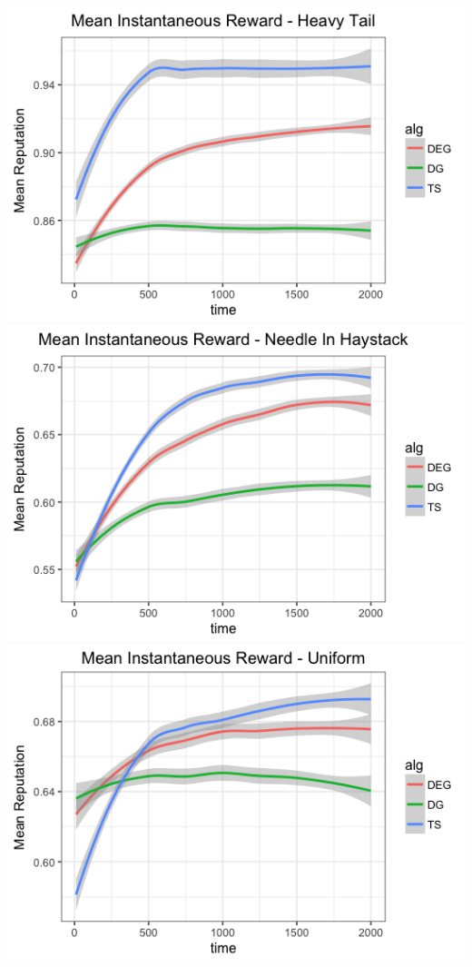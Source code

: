\documentclass[11pt,letterpaper]{article}
\theoremstyle{definition}
\begin{document}
\begin{center}
\includegraphics[scale=0.35]{figures/mean_inst_reward_ht} \\
\includegraphics[scale=0.35]{figures/mean_inst_reward_nih} \\
\includegraphics[scale=0.35]{figures/mean_inst_reward_uniform}
\end{center}
\end{document}
